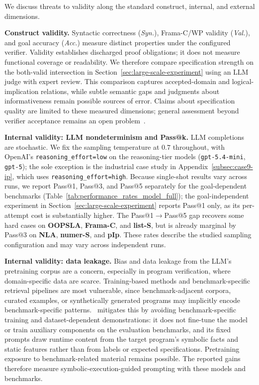We discuss threats to validity along the standard construct, internal, and
external dimensions.

\smallskip
\noindent\textbf{Construct validity.}
Syntactic correctness (\emph{Syn.}), Frama-C/WP validity (\emph{Val.}), and goal accuracy (\emph{Acc.}) measure distinct properties under the configured verifier. Validity establishes discharged proof obligations; it does not measure functional coverage or readability. We therefore compare specification strength on the both-valid intersection in Section~\ref{sec:large-scale-experiment} using an LLM judge with expert review. This comparison captures accepted-domain and logical-implication relations, while subtle semantic gaps and judgments about informativeness remain possible sources of error. Claims about specification quality are limited to these measured dimensions; general assessment beyond verifier acceptance remains an open problem~\cite{yang2026how,thakur2025clever}.

\smallskip
\noindent\textbf{Internal validity: LLM nondeterminism and Pass@k.}
LLM completions are stochastic. We fix the sampling temperature at $0.7$
throughout, with OpenAI's \texttt{reasoning\_effort=low} on the reasoning-tier
models (\texttt{gpt-5.4-mini}, \texttt{gpt-5}); the sole exception is the
industrial case study in {Appendix}~\ref{subsec:case9-ip}, which uses
\texttt{reasoning\_effort=high}.
Because single-shot results vary across runs, we report Pass@1,
Pass@3, and Pass@5 separately for the goal-dependent benchmarks
(Table~\ref{tab:performance_rates_model_full}); the goal-independent
experiment in Section~\ref{sec:large-scale-experiment} reports Pass@1 only, as its
per-attempt cost is substantially higher. The Pass@1$\to$Pass@5 gap recovers
some hard cases on \textbf{OOPSLA}, \textbf{Frama-C}, and \textbf{list-S}, but is
already marginal by Pass@3 on \textbf{NLA}, \textbf{numer-S}, and \textbf{pIp}.
These rates describe the studied sampling configuration and may vary across independent runs.

\smallskip
\noindent\textbf{Internal validity: data leakage.}
Bias and data leakage from the LLM's pretraining corpus are a concern,
especially in program verification, where domain-specific data are scarce.
Training-based methods and benchmark-specific retrieval pipelines are most
vulnerable, since benchmark-adjacent corpora, curated examples, or synthetically
generated programs may implicitly encode benchmark-specific patterns.
\toolname\ mitigates this by avoiding benchmark-specific training and
dataset-dependent demonstrations: it does not fine-tune the model or train
auxiliary components on the evaluation benchmarks, and its fixed prompts draw
runtime content from the target program's symbolic facts and static features
rather than from labels or expected specifications. Pretraining exposure to benchmark-related material remains possible. The reported gains therefore measure symbolic-execution-guided prompting with these models and benchmarks.

